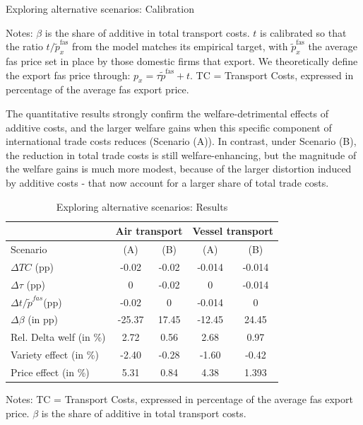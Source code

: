 \documentclass[a4paper,11pt]{article}
\begin{document}
\begin{table}[htb]
  \centering
  \caption{Exploring alternative scenarios: Calibration }\label{tab:calib_TC_appendix}
\begin{center}
	
\end{center}
{\parbox[l]{13cm}{ \vspace{4pt}\footnotesize{Notes: $\beta$ is the share of additive in total transport costs. $t$ is calibrated so that the ratio $t/\widetilde{p}^{\text{fas}}_x$ from the model matches its empirical target, with $\widetilde{p}^{\text{fas}}_x$ the average fas price set in place by those domestic firms that export. We theoretically define the export fas price through: $p_x = \tau \widetilde{p}^{\text{fas}} +t$. TC = Transport Costs, expressed in percentage of the average fas export price. }}}
\end{table}


The quantitative results strongly confirm the welfare-detrimental effects of additive costs, and the larger welfare gains when this specific component of international trade costs reduces (Scenario (A)). In contrast, under Scenario (B), the reduction in total trade costs is still welfare-enhancing, but the magnitude of the welfare gains is much more modest, because of the larger distortion induced by additive costs - that now account for a larger share of total trade costs.

\begin{table}[htb]
  \centering
  \caption{Exploring alternative scenarios: Results }\label{tab:results_model_appendix}
\begin{center}
\begin{tabular}{l|cc|cc}
\hline \hline
& \multicolumn{2}{|c|}{Air transport} & \multicolumn{2}{|c}{Vessel transport} \\ \hline
Scenario & (A) & (B) & (A) & (B) \\ \hline
$\Delta TC$ (pp)&	-0.02	&-0.02	&-0.014&	-0.014 \\
$\Delta \tau$ (pp)&	0	&-0.02&	0&	-0.014 \\
$\Delta t/\widetilde{p}^{fas} $(pp)&	-0.02	&0	&-0.014&	0 \\
$\Delta \beta$ (in pp)	&-25.37&	17.45	&-12.45&	24.45 \\ \hline
Rel. Delta welf (in \%)&	2.72&	0.56	&2.68	&0.97 \\
\hspace{1em}Variety effect (in \%)	&-2.40&	-0.28&	-1.60	&-0.42 \\
\hspace{1em}Price effect (in \%)	&5.31 &0.84&	4.38	&1.393 \\
\hline \hline
\end{tabular}
\end{center}
{\parbox[l]{10cm}{ \vspace{4pt}\footnotesize{Notes: TC = Transport Costs, expressed in percentage of the average fas export price. $\beta$ is the share of additive in total transport costs.}}}
\end{table}
\end{document}
